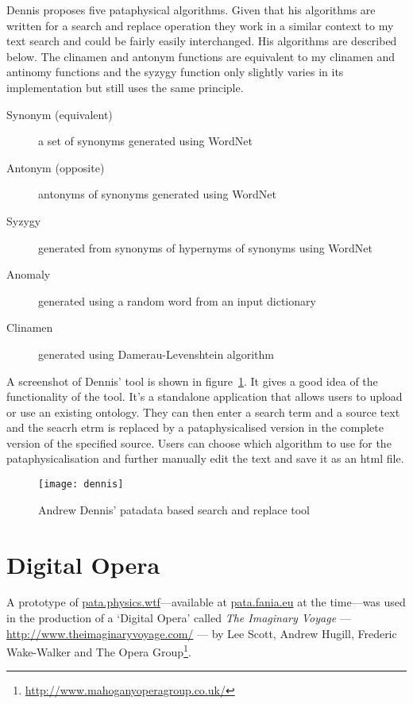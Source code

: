 Dennis proposes five pataphysical algorithms. Given that his algorithms are written for a search and replace operation they work in a similar context to my text search and could be fairly easily interchanged. His algorithms are described below. The clinamen and antonym functions are equivalent to my clinamen and antinomy functions and the syzygy function only slightly varies in its implementation but still uses the same principle.

\begin{description}
  \item[Synonym (equivalent)] a set of synonyms generated using WordNet
  \item[Antonym (opposite)] antonyms of synonyms generated using WordNet
  \item[Syzygy] generated from synonyms of hypernyms of synonyms using WordNet
  \item[Anomaly] generated using a random word from an input dictionary
  \item[Clinamen] generated using Damerau-Levenshtein algorithm
\end{description}

A screenshot of Dennis' tool is shown in figure~\ref{fig:dennis}. It gives a good idea of the functionality of the tool. It's a standalone application that allows users to upload or use an existing ontology. They can then enter a search term and a source text and the seacrh etrm is replaced by a pataphysicalised version in the complete version of the specified source. Users can choose which algorithm to use for the pataphysicalisation and further manually edit the text and save it as an \gls{html} file.

\begin{figure}[!htbp]
  \centering
  \texttt{[image: dennis]}
\caption[Andrew Dennis' Search and Replace]{Andrew Dennis' patadata based search and replace tool}
\label{fig:dennis}
\end{figure}



\section{Digital Opera}

A prototype of \url{pata.physics.wtf}---available at \url{pata.fania.eu} at the time---was used in the production of a `Digital Opera' called \emph{The Imaginary Voyage} --- \url{http://www.theimaginaryvoyage.com/} --- by Lee Scott, Andrew Hugill, Frederic Wake-Walker and The Opera Group\footnote{\url{http://www.mahoganyoperagroup.co.uk/}}.

